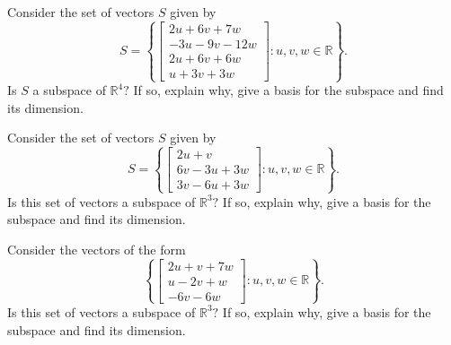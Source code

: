 \documentclass{ximera}
\begin{document}
\begin{problem}\label{prb:5.17} Consider the set of vectors $S$ given by
\begin{equation*}
S =
\left\{ \left[
\begin{array}{c}
2u+6v+7w \\
-3u-9v-12w \\
2u+6v+6w \\
u+3v+3w
\end{array}
\right] :u,v,w\in \mathbb{R}\right\} .
\end{equation*}
Is $S$ a subspace of $\mathbb{R}^{4}?$ If so, explain why,
give a basis for the subspace and find its dimension.
\end{problem}

\begin{problem}\label{prb:5.18} Consider the set of vectors $S$ given by
\begin{equation*}
S =
\left\{ \left[
\begin{array}{c}
2u+v \\
6v-3u+3w \\
3v-6u+3w
\end{array}
\right] :u,v,w\in \mathbb{R}\right\} .
\end{equation*}
Is this set of vectors a subspace of $\mathbb{R}^{3}?$ If so, explain why,
give a basis for the subspace and find its dimension.
\end{problem}

\begin{problem}\label{prb:5.19} Consider the vectors of the form
\begin{equation*}
\left\{ \left[
\begin{array}{c}
2u+v+7w \\
u-2v+w \\
-6v-6w
\end{array}
\right] :u,v,w\in \mathbb{R}\right\} .
\end{equation*}
Is this set of vectors a subspace of $\mathbb{R}^{3}?$ If so, explain why,
give a basis for the subspace and find its dimension.
\end{problem}
\end{document}
